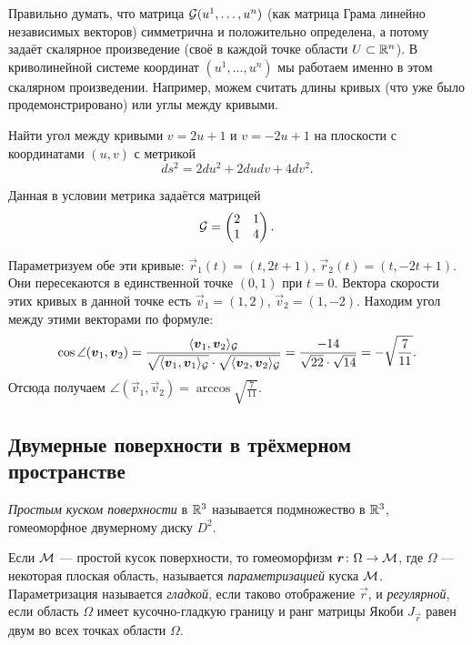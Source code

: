Правильно думать, что матрица $\mathcal{G}(u^1, \ldots, u^n)$ (как матрица Грама линейно независимых векторов) симметрична и положительно определена, а потому задаёт скалярное произведение (своё в каждой точке области $U \subset \mathbb{R}^n$). В криволинейной системе координат $(u^1, \ldots, u^n)$ мы работаем именно в этом скалярном произведении. Например, можем считать длины кривых (что уже было продемонстрировано) или углы между кривыми.

\begin{problem}
	Найти угол между кривыми $v = 2u + 1$ и $v = -2u + 1$ на плоскости с координатами $(u, v)$ с метрикой
	\[
		ds^2 = 2du^2 + 2dudv + 4dv^2.
	\]
\end{problem}

\begin{solution}
	Данная в условии метрика задаётся матрицей
	\[
		\mathcal{G} =
		\begin{pmatrix}
			2 & 1\\
			1 & 4
		\end{pmatrix}.
	\]

	Параметризуем обе эти кривые: $\vec{r}_1(t) = (t, 2t + 1)$, $\vec{r}_2(t) = (t, -2t + 1)$. Они пересекаются в единственной точке $(0, 1)$ при $t = 0$. Вектора скорости этих кривых в данной точке есть $\vec{v}_1 = (1, 2)$, $\vec{v}_2 = (1, -2)$. Находим угол между этими векторами по формуле:
	\[
		\cos\angle(\boldsymbol{v}_1, \boldsymbol{v}_2) = \frac{\langle\boldsymbol{v}_1, \boldsymbol{v}_2\rangle_{\mathcal{G}}}{\sqrt{\langle\boldsymbol{v}_1, \boldsymbol{v}_1\rangle_{\mathcal{G}}} \cdot \sqrt{\langle\boldsymbol{v}_2, \boldsymbol{v}_2\rangle_{\mathcal{G}}}} = \frac{-14}{\sqrt{22} \cdot \sqrt{14}} = -\sqrt{\frac{7}{11}}.
	\]
	Отсюда получаем $\angle(\vec{v}_1, \vec{v}_2) = \arccos\sqrt{\frac{7}{11}}$.
\end{solution}

\subsection{Двумерные поверхности в трёхмерном пространстве}

\begin{definition}
	\textit{Простым куском поверхности} в $\mathbb{R}^3$ называется подмножество в $\mathbb{R}^3$, гомеоморфное двумерному диску $D^2$.
\end{definition}

\begin{definition}
	Если $\mathcal{M}$ --- простой кусок поверхности, то гомеоморфизм $\boldsymbol{r}\colon \Omega \to \mathcal{M}$, где $\Omega$ --- некоторая плоская область\footnotemark, называется \textit{параметризацией} куска $\mathcal{M}$. Параметризация называется \textit{гладкой}, если таково отображение $\vec{r}$, и \textit{регулярной}, если область $\Omega$ имеет кусочно-гладкую границу и ранг матрицы Якоби $J_{\vec{r}}$ равен двум во всех точках области $\Omega$.
\end{definition}

